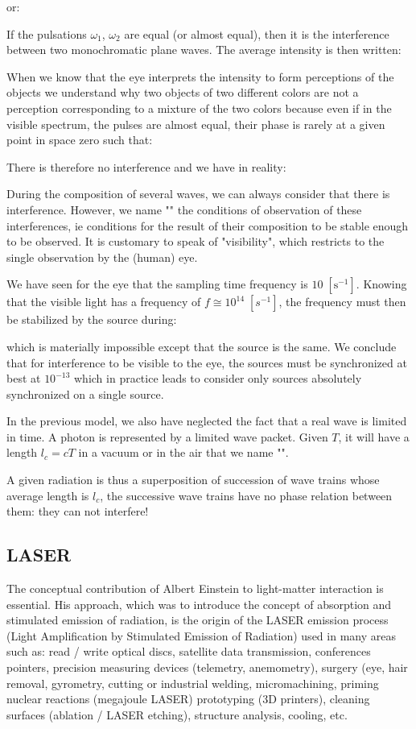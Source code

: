 	or:
	
	If the pulsations $\omega_1$, $\omega_2$ are equal (or almost equal), then it is the interference between two monochromatic plane waves. The average intensity is then written:
	
	When we know that the eye interprets the intensity to form perceptions of the objects we understand why two objects of two different colors are not a perception corresponding to a mixture of the two colors because even if in the visible spectrum, the pulses are almost equal, their phase is rarely at a given point in space zero such that:
	
	There is therefore no interference and we have in reality:
	
	\begin{tcolorbox}[title=Remark,colframe=black,arc=10pt]
	During the composition of several waves, we can always consider that there is interference. However, we name "" the conditions of observation of these interferences, ie conditions for the result of their composition to be stable enough to be observed. It is customary to speak of "visibility", which restricts to the single observation by the (human) eye.
	\end{tcolorbox}
	We have seen for the eye that the sampling time frequency is $10\;[\text{s}^{-1}]$. Knowing that the visible light has a frequency of $f\cong 10^{14}\;[s^{-1}]$, the frequency must then be stabilized by the source during:
	
	which is materially impossible except that the source is the same. We conclude that for interference to be visible to the eye, the sources must be synchronized at best at $10^{-13}$ which in practice leads to consider only sources absolutely synchronized on a single source.

	In the previous model, we also have neglected the fact that a real wave is limited in time. A photon is represented by a limited wave packet. Given $T$, it will have a length $l_c=cT$ in a vacuum or in the air that we name "".

	A given radiation is thus a superposition of succession of wave trains whose average length is $l_c$, the successive wave trains have no phase relation between them: they can not interfere!
	
	\pagebreak
	\subsection{LASER}
	The conceptual contribution of Albert Einstein to light-matter interaction is essential. His approach, which was to introduce the concept of absorption and stimulated emission of radiation, is the origin of the LASER emission process (Light Amplification by Stimulated Emission of Radiation) used in many areas such as: read / write optical discs, satellite data transmission, conferences pointers, precision measuring devices (telemetry, anemometry), surgery (eye, hair removal, gyrometry, cutting or industrial welding, micromachining, priming nuclear reactions (megajoule  LASER) prototyping (3D printers), cleaning surfaces (ablation / LASER etching), structure analysis, cooling, etc.

